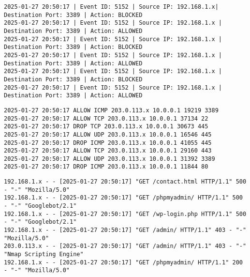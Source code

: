 \documentclass[11pt]{article}
\begin{document}
\begin{verbatim}
2025-01-27 20:50:17 | Event ID: 5152 | Source IP: 192.168.1.x| Destination Port: 3389 | Action: BLOCKED
2025-01-27 20:50:17 | Event ID: 5152 | Source IP: 192.168.1.x | Destination Port: 3389 | Action: ALLOWED
2025-01-27 20:50:17 | Event ID: 5152 | Source IP: 192.168.1.x | Destination Port: 3389 | Action: BLOCKED
2025-01-27 20:50:17 | Event ID: 5152 | Source IP: 192.168.1.x | Destination Port: 3389 | Action: ALLOWED
2025-01-27 20:50:17 | Event ID: 5152 | Source IP: 192.168.1.x | Destination Port: 3389 | Action: BLOCKED
2025-01-27 20:50:17 | Event ID: 5152 | Source IP: 192.168.1.x | Destination Port: 3389 | Action: ALLOWED
\end{verbatim}

\begin{verbatim}
2025-01-27 20:50:17 ALLOW ICMP 203.0.113.x 10.0.0.1 19219 3389
2025-01-27 20:50:17 ALLOW TCP 203.0.113.x 10.0.0.1 37134 22
2025-01-27 20:50:17 DROP TCP 203.0.113.x 10.0.0.1 30673 445
2025-01-27 20:50:17 ALLOW UDP 203.0.113.x 10.0.0.1 16546 445
2025-01-27 20:50:17 DROP ICMP 203.0.113.x 10.0.0.1 41055 445
2025-01-27 20:50:17 ALLOW TCP 203.0.113.x 10.0.0.1 29160 443
2025-01-27 20:50:17 ALLOW UDP 203.0.113.x 10.0.0.1 31392 3389
2025-01-27 20:50:17 DROP ICMP 203.0.113.x 10.0.0.1 11844 80
\end{verbatim}

\begin{verbatim}
192.168.1.x - - [2025-01-27 20:50:17] "GET /contact.html HTTP/1.1" 500 - "-" "Mozilla/5.0"
192.168.1.x - - [2025-01-27 20:50:17] "GET /phpmyadmin/ HTTP/1.1" 500 - "-" "Googlebot/2.1"
192.168.1.x - - [2025-01-27 20:50:17] "GET /wp-login.php HTTP/1.1" 500 - "-" "Googlebot/2.1"
192.168.1.x - - [2025-01-27 20:50:17] "GET /admin/ HTTP/1.1" 403 - "-" "Mozilla/5.0"
203.0.113.x - - [2025-01-27 20:50:17] "GET /admin/ HTTP/1.1" 403 - "-" "Nmap Scripting Engine"
192.168.1.x - - [2025-01-27 20:50:17] "GET /phpmyadmin/ HTTP/1.1" 200 - "-" "Mozilla/5.0"
\end{verbatim}
\end{document}
